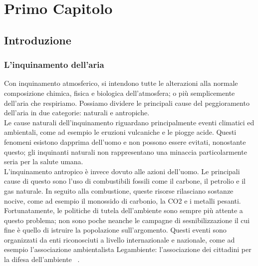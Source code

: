 \clearpage{\pagestyle{empty}\cleardoublepage}
\chapter{Primo Capitolo}                %
\lhead[\fancyplain{}{\bfseries\thepage}]{\fancyplain{}{\bfseries\rightmark}}

\section{Introduzione}
\subsection{L'inquinamento dell'aria}
Con inquinamento atmosferico, si intendono tutte le alterazioni alla normale composizione chimica, fisica e biologica dell’atmosfera; o più semplicemente dell’aria che respiriamo.
Possiamo dividere le principali cause del peggioramento dell’aria in due categorie: naturali e antropiche.
\\
Le cause naturali dell'inquinamento riguardano principalmente eventi climatici ed ambientali, come ad esempio le eruzioni vulcaniche e le piogge acide.
Questi fenomeni esistono dapprima dell'uomo e non possono essere evitati, nonostante questo; gli inquinanti naturali non rappresentano una minaccia particolarmente seria per la salute umana.
\\
L'inquinamento antropico è invece dovuto alle azioni dell'uomo. Le principali cause di questo sono l’uso di combustibili fossili come il carbone, il petrolio e il gas naturale.
In seguito alla combustione, queste risorse rilasciano sostanze nocive, come ad esempio il monossido di carbonio, la CO2 e i metalli pesanti.
Fortunatamente, le politiche di tutela dell'ambiente sono sempre più attente a questo problema;
non sono poche neanche le campagne di sesnibilizzazione il cui fine è quello di istruire la popolazione sull'argomento. Questi eventi sono organizzati da enti riconosciuti a livello internazionale e nazionale, come ad esempio l'associazione ambientalista Legambiente: l'associazione dei cittadini per la difesa dell'ambiente ~\cite{la_mincrometrologia}.
\\
